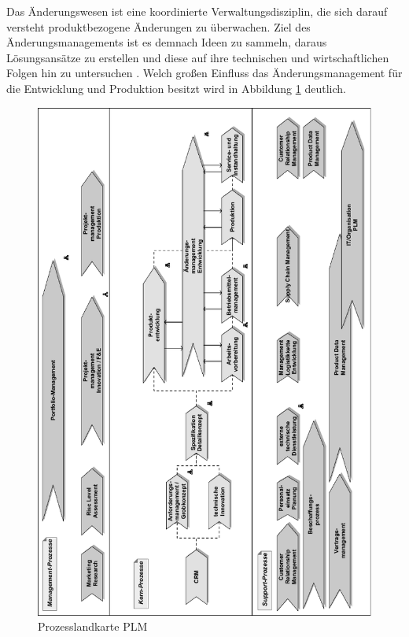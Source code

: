 \documentclass[a4paper,12pt]{report}
\begin{document}
Das Änderungswesen ist eine koordinierte Verwaltungsdisziplin, die sich darauf versteht produktbezogene Änderungen zu überwachen. Ziel des Änderungsmanagements ist es demnach Ideen zu sammeln, daraus Lösungsansätze zu erstellen und diese auf ihre technischen und wirtschaftlichen Folgen hin zu untersuchen \citep[vgl.][S. VII]{Prostep2007}. Welch großen Einfluss das Änderungsmanagement für die Entwicklung und Produktion besitzt wird in Abbildung \ref{plm_process_map} deutlich.
\begin{figure}[ht]
\centering
\includegraphics[height=0.9\textheight]{Images/plm_process_map}
\caption[Prozesslandkarte PLM]{Prozesslandkarte PLM \citep[S. 36]{Scheer2006}}
\label{plm_process_map}
\end{figure}
\end{document}
